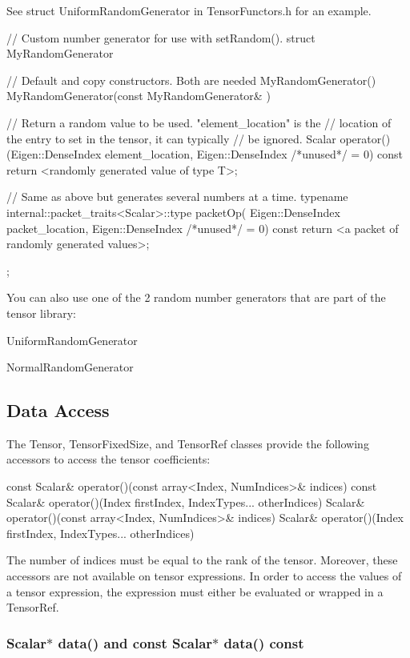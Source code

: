 See {\ttfamily struct Uniform\+Random\+Generator} in Tensor\+Functors.\+h for an example. \begin{DoxyVerb}// Custom number generator for use with setRandom().
struct MyRandomGenerator {
  // Default and copy constructors. Both are needed
  MyRandomGenerator() { }
  MyRandomGenerator(const MyRandomGenerator& ) { }

  // Return a random value to be used.  "element_location" is the
  // location of the entry to set in the tensor, it can typically
  // be ignored.
  Scalar operator()(Eigen::DenseIndex element_location,
                    Eigen::DenseIndex /*unused*/ = 0) const {
    return <randomly generated value of type T>;
  }

  // Same as above but generates several numbers at a time.
  typename internal::packet_traits<Scalar>::type packetOp(
      Eigen::DenseIndex packet_location, Eigen::DenseIndex /*unused*/ = 0) const {
    return <a packet of randomly generated values>;
  }
};
\end{DoxyVerb}


You can also use one of the 2 random number generators that are part of the tensor library\+:
\begin{DoxyItemize}
\item Uniform\+Random\+Generator
\item Normal\+Random\+Generator
\end{DoxyItemize}

\subsection*{Data Access}

The Tensor, Tensor\+Fixed\+Size, and Tensor\+Ref classes provide the following accessors to access the tensor coefficients\+: \begin{DoxyVerb}const Scalar& operator()(const array<Index, NumIndices>& indices)
const Scalar& operator()(Index firstIndex, IndexTypes... otherIndices)
Scalar& operator()(const array<Index, NumIndices>& indices)
Scalar& operator()(Index firstIndex, IndexTypes... otherIndices)
\end{DoxyVerb}


The number of indices must be equal to the rank of the tensor. Moreover, these accessors are not available on tensor expressions. In order to access the values of a tensor expression, the expression must either be evaluated or wrapped in a Tensor\+Ref.

\subsubsection*{Scalar$\ast$ data() and const Scalar$\ast$ data() const}

